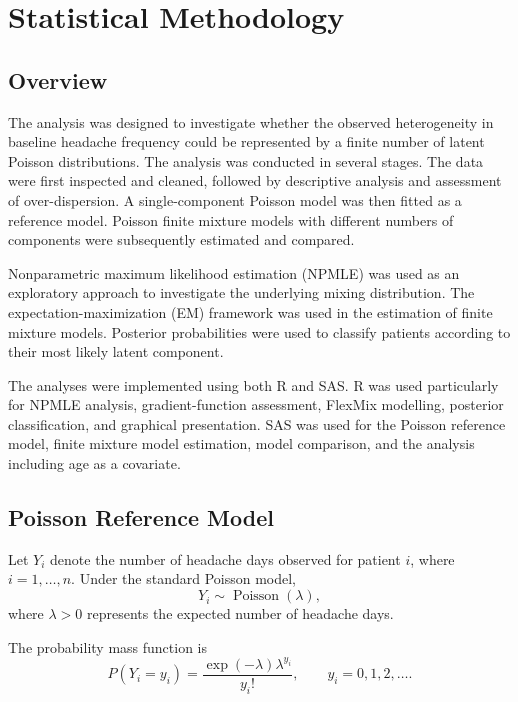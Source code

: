 
\section{Statistical Methodology}
\label{sec:methodology}

\subsection{Overview}

The analysis was designed to investigate whether the observed heterogeneity in baseline headache frequency could be represented by a finite number of latent Poisson distributions. The analysis was conducted in several stages. The data were first inspected and cleaned, followed by descriptive analysis and assessment of over-dispersion. A single-component Poisson model was then fitted as a reference model. Poisson finite mixture models with different numbers of components were subsequently estimated and compared.

Nonparametric maximum likelihood estimation (NPMLE) was used as an exploratory approach to investigate the underlying mixing distribution. The expectation-maximization (EM) framework was used in the estimation of finite mixture models. Posterior probabilities were used to classify patients according to their most likely latent component.

The analyses were implemented using both R and SAS. R was used particularly for NPMLE analysis, gradient-function assessment, FlexMix modelling, posterior classification, and graphical presentation. SAS was used for the Poisson reference model, finite mixture model estimation, model comparison, and the analysis including age as a covariate.

\subsection{Poisson Reference Model}

Let $Y_i$ denote the number of headache days observed for patient $i$, where $i=1,\ldots,n$. Under the standard Poisson model,
\[
Y_i \sim \operatorname{Poisson}(\lambda),
\]
where $\lambda>0$ represents the expected number of headache days.

The probability mass function is
\[
P(Y_i=y_i)=\frac{\exp(-\lambda)\lambda^{y_i}}{y_i!},\qquad y_i=0,1,2,\ldots.
\]

